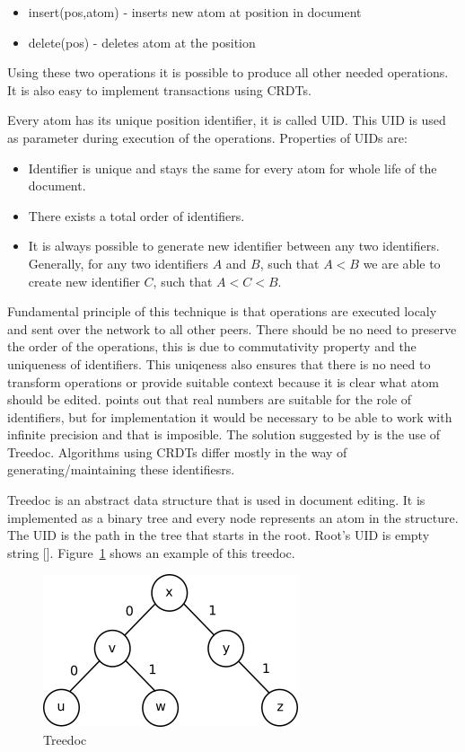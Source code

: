 \documentclass[12pt,oneside]{fithesis2}
\begin{document}
\begin{itemize}
\item insert(pos,atom) - inserts new atom at position in document
\item delete(pos) - deletes atom at the position 
\end{itemize}
Using these two operations it is possible to produce all other needed operations. It is also easy to implement transactions using CRDTs. 
\par Every atom has its unique position identifier, it is called UID. This UID is used as parameter during execution of the operations. Properties of UIDs are:
\begin{itemize}
\item Identifier is unique and stays the same for every atom for whole life of the document.
\item There exists a total order of identifiers.
\item It is always possible to generate new identifier between any two identifiers. Generally, for any two identifiers \(A\) and \(B\), such that \(A < B\) we are able to create new identifier \(C\), such that \(A < C < B\).
\end{itemize}
Fundamental principle of this technique is that operations are executed localy and sent over the network to all other peers. There should be no need to preserve the order of the operations, this is due to commutativity property and the uniqueness of identifiers. This uniqeness also ensures that there is no need to transform operations or provide suitable context because it is clear what atom should be edited.
\cite{Shapiro-design} points out that real numbers are suitable for the role of identifiers, but for implementation it would be necessary to be able to work with infinite precision and that is imposible. The solution suggested by \cite{Shapiro-design} is the use of Treedoc. Algorithms using CRDTs differ mostly in the way of generating/maintaining these identifiesrs.
\par Treedoc is an abstract data structure that is used in document editing. It is implemented as a binary tree and every node represents an atom in the structure. The UID is the path in the tree that starts in the root. Root's UID is empty string []. Figure~\ref{fig:treedoc} shows an example of this treedoc.
\begin{figure}[H]
\caption{Treedoc}
\label{fig:treedoc}
\centering
\vspace{5mm}
\includegraphics{treedoc1} 
\end{figure}
\end{document}
